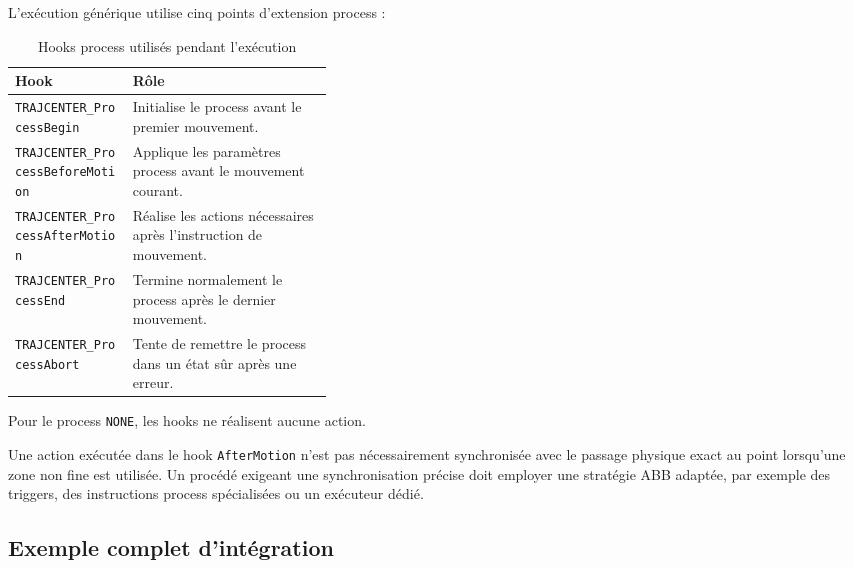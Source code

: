 \documentclass{rapportENSAM}
\begin{document}
L'exécution générique utilise cinq points d'extension process :

\begin{table}[ht]
    \centering
    \begin{tabularx}{\linewidth}{
        |p{0.37\linewidth}
        |X|
    }
        \hline
        \textbf{Hook} &
        \textbf{Rôle} \\
        \hline

        \texttt{TRAJCENTER\_ProcessBegin} &
        Initialise le process avant le premier mouvement. \\
        \hline

        \texttt{TRAJCENTER\_ProcessBeforeMotion} &
        Applique les paramètres process avant le mouvement courant. \\
        \hline

        \texttt{TRAJCENTER\_ProcessAfterMotion} &
        Réalise les actions nécessaires après l'instruction de mouvement. \\
        \hline

        \texttt{TRAJCENTER\_ProcessEnd} &
        Termine normalement le process après le dernier mouvement. \\
        \hline

        \texttt{TRAJCENTER\_ProcessAbort} &
        Tente de remettre le process dans un état sûr après une erreur. \\
        \hline
    \end{tabularx}
    \caption{Hooks process utilisés pendant l'exécution}
    \label{tab:rapid-process-hooks}
\end{table}

Pour le process \texttt{NONE}, les hooks ne réalisent aucune action.

Une action exécutée dans le hook \texttt{AfterMotion} n'est pas
nécessairement synchronisée avec le passage physique exact au point lorsqu'une
zone non fine est utilisée. Un procédé exigeant une synchronisation précise
doit employer une stratégie ABB adaptée, par exemple des triggers, des
instructions process spécialisées ou un exécuteur dédié.


\subsection{Exemple complet d'intégration}
\label{subsec:rapid-integration-examples}
\end{document}
